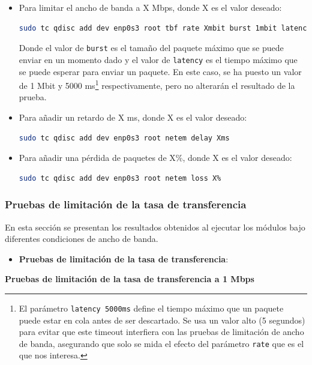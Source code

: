 \begin{itemize}
    \item Para limitar el ancho de banda a X Mbps, donde X es el valor deseado:
    \begin{lstlisting}[language=bash, breaklines=true]
    sudo tc qdisc add dev enp0s3 root tbf rate Xmbit burst 1mbit latency 5000ms
\end{lstlisting}
    Donde el valor de \texttt{burst} es el tamaño del paquete máximo que se puede enviar en un momento dado y el valor de \texttt{latency} es el tiempo máximo que se puede esperar para enviar un paquete. En este caso, se ha puesto un valor de 1 Mbit y 5000 ms\footnote{El parámetro \texttt{latency 5000ms} define el tiempo máximo que un paquete puede estar en cola antes de ser descartado. Se usa un valor alto (5 segundos) para evitar que este timeout interfiera con las pruebas de limitación de ancho de banda, asegurando que solo se mida el efecto del parámetro \texttt{rate} que es el que nos interesa.} respectivamente, pero no alterarán el resultado de la prueba.
    \item Para añadir un retardo de X ms, donde X es el valor deseado:
    \begin{lstlisting}[language=bash]
    sudo tc qdisc add dev enp0s3 root netem delay Xms
\end{lstlisting}
    \item Para añadir una pérdida de paquetes de X\%, donde X es el valor deseado:
    \begin{lstlisting}[language=bash]
    sudo tc qdisc add dev enp0s3 root netem loss X%
\end{lstlisting}
\end{itemize}


\newpage

\subsubsection{Pruebas de limitación de la tasa de transferencia}

En esta sección se presentan los resultados obtenidos al ejecutar los módulos bajo diferentes condiciones de ancho de banda. 
\vspace{\baselineskip}

\begin{itemize}
    \item \textbf{Pruebas de limitación de la tasa de transferencia}:
\end{itemize}

\textbf{Pruebas de limitación de la tasa de transferencia a 1 Mbps}
\vspace{\baselineskip}

